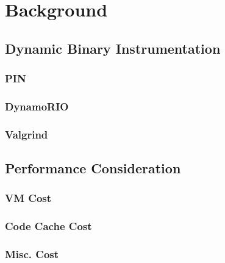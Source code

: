 \section{Background}
\label{sec:background}

\subsection{Dynamic Binary Instrumentation}
\subsubsection{PIN}
\subsubsection{DynamoRIO}
\subsubsection{Valgrind}
\subsection{Performance Consideration}
\subsubsection{VM Cost}
\subsubsection{Code Cache Cost}
\subsubsection{Misc. Cost}
